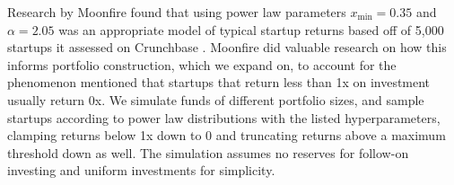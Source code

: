 \documentclass[a4paper, oneside]{discothesis}
\begin{document}
\pagebreak

Research by Moonfire found that using power law parameters $x_{\text{min}} = 0.35$ and $\alpha = 2.05$ was an appropriate model of typical 
startup returns based off of 5,000 startups it assessed on Crunchbase \cite{farina_arpaia_2023_venture_capital_portfolio_construction}. Moonfire did valuable research on how this informs portfolio construction, which we expand on, to account for the phenomenon mentioned that startups that return less than 1x on investment usually return 0x. We simulate funds of different portfolio sizes, and sample startups according to power law distributions with the listed hyperparameters, clamping returns below 1x down to 0 and truncating returns above a maximum threshold down as well. The simulation assumes no reserves for follow-on investing and uniform investments for simplicity.
\end{document}
